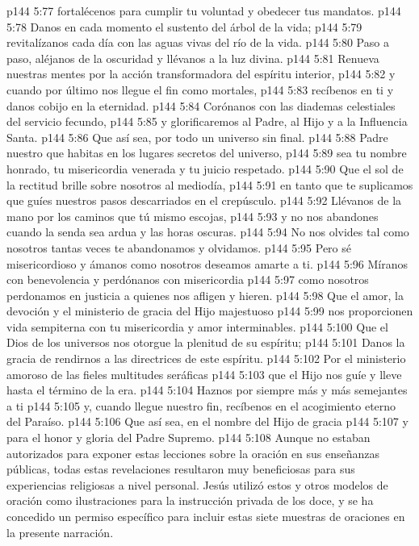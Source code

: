 \vs p144 5:77 \hsetoff fortalécenos para cumplir tu voluntad y obedecer tus mandatos.
\vs p144 5:78 Danos en cada momento el sustento del árbol de la vida;
\vs p144 5:79 \hsetoff revitalízanos cada día con las aguas vivas del río de la vida.
\vs p144 5:80 Paso a paso, aléjanos de la oscuridad y llévanos a la luz divina.
\vs p144 5:81 \hsetoff Renueva nuestras mentes por la acción transformadora del espíritu interior,
\vs p144 5:82 y cuando por último nos llegue el fin como mortales,
\vs p144 5:83 \hsetoff recíbenos en ti y danos cobijo en la eternidad.
\vs p144 5:84 Corónanos con las diademas celestiales del servicio fecundo,
\vs p144 5:85 \hsetoff y glorificaremos al Padre, al Hijo y a la Influencia Santa.
\vs p144 5:86 Que así sea, por todo un universo sin final.
\separatorline
\vs p144 5:88 Padre nuestro que habitas en los lugares secretos del universo,
\vs p144 5:89 \hsetoff sea tu nombre honrado, tu misericordia venerada y tu juicio respetado.
\vs p144 5:90 Que el sol de la rectitud brille sobre nosotros al mediodía,
\vs p144 5:91 \hsetoff en tanto que te suplicamos que guíes nuestros pasos descarriados en el crepúsculo.
\vs p144 5:92 Llévanos de la mano por los caminos que tú mismo escojas,
\vs p144 5:93 \hsetoff y no nos abandones cuando la senda sea ardua y las horas oscuras.
\vs p144 5:94 No nos olvides tal como nosotros tantas veces te abandonamos y olvidamos.
\vs p144 5:95 \hsetoff Pero sé misericordioso y ámanos como nosotros deseamos amarte a ti.
\vs p144 5:96 Míranos con benevolencia y perdónanos con misericordia
\vs p144 5:97 \hsetoff como nosotros perdonamos en justicia a quienes nos afligen y hieren.
\vs p144 5:98 Que el amor, la devoción y el ministerio de gracia del Hijo majestuoso
\vs p144 5:99 \hsetoff nos proporcionen vida sempiterna con tu misericordia y amor interminables.
\vs p144 5:100 Que el Dios de los universos nos otorgue la plenitud de su espíritu;
\vs p144 5:101 \hsetoff Danos la gracia de rendirnos a las directrices de este espíritu.
\vs p144 5:102 Por el ministerio amoroso de las fieles multitudes seráficas
\vs p144 5:103 \hsetoff que el Hijo nos guíe y lleve hasta el término de la era.
\vs p144 5:104 Haznos por siempre más y más semejantes a ti
\vs p144 5:105 \hsetoff y, cuando llegue nuestro fin, recíbenos en el acogimiento eterno del Paraíso.
\vs p144 5:106 Que así sea, en el nombre del Hijo de gracia
\vs p144 5:107 \hsetoff y para el honor y gloria del Padre Supremo.
\vsetoff
\vs p144 5:108 Aunque no estaban autorizados para exponer estas lecciones sobre la oración en sus enseñanzas públicas, todas estas revelaciones resultaron muy beneficiosas para sus experiencias religiosas a nivel personal. Jesús utilizó estos y otros modelos de oración como ilustraciones para la instrucción privada de los doce, y se ha concedido un permiso específico para incluir estas siete muestras de oraciones en la presente narración.
